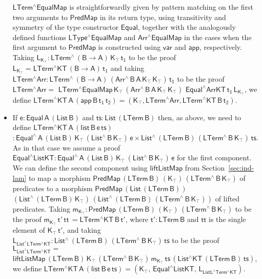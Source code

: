 \documentclass[9pt]{entcs}
\begin{document}
\begin{itemize}
  $\mathsf{LTerm^\wedge EqualMap}$ is straightforwardly given by
  pattern matching on the first two arguments to $\mathsf{PredMap}$ in
  its return type, using transitivity and symmetry of the type
  constructor $\mathsf{Equal}$, together with the analogously defined
  functions $\mathsf{LType^\wedge EqualMap}$ and $\mathsf{Arr^\wedge
    EqualMap}$ in the cases when the first argument to
  $\mathsf{PredMap}$ is constructed using $\mathsf{var}$ and
  $\mathsf{app}$, respectively. Taking $\mathsf{L_{K_\top} :
    LTerm^{\wedge}\, (B \to A) \, K_\top\, t_1}$ to be the proof
  $\mathsf{L_{K_\top} = LTerm^\wedge KT\, (B \to A)\, t_1}$ and taking
  $\mathsf{ LTerm^\wedge Arr : LTerm^{\wedge}\, (B \to A)\,
    (Arr^{\wedge} \, B\, A\, K_\top \, K_\top)\, t_1}$ to be the proof
  $\mathsf{LTerm^\wedge Arr =}$ $\mathsf{LTerm^\wedge
    EqualMap\,K_\top\,(Arr^{\wedge}\,B\,A\,K_\top\,K_\top)\,\,
    Equal^\wedge ArrKT\, t_1\, L_{K_\top}}$, we define
  $\mathsf{LTerm^\wedge KT\,A\, (app\, B\, t_1\, t_2) = (K_\top ,
    LTerm^\wedge Arr , LTerm^\wedge KT\,B\,t_2)}$.
\item If $\mathsf{e : Equal\,A\,(List\,B)}$ and $\mathsf{ts :
  List\,(LTerm\, B)}$ then, as above, we need to define
  $\mathsf{LTerm^\wedge KT\,A\, (list\, B \,e\, ts)}$ $\mathsf{:
  Equal^{\wedge} \, A\, (List\,B)\, K_\top\, (List^{\wedge} \, B\,
  K_\top) \, e \times List^{\wedge}\, (LTerm\,B) \, (LTerm^{\wedge} \,
  B\, K_\top) \, ts }$.  As in that case we assume a proof
  $\mathsf{Equal^\wedge ListKT : Equal^{\wedge} \, A\, (List\,B)\, K_\top\,
  (List^{\wedge} \, B\, K_\top) \, e}$ for the first component.  We
  can define the second component using $\mathsf{liftListMap}$ from
  Section~\ref{sec:ind-lam} to map a morphism $\mathsf{PredMap\,
    (LTerm\,B)\, (K_\top)\, (LTerm^{\wedge}\,B\,K_\top)}$ of
  predicates to a morphism $\mathsf{PredMap\,(List\,(LTerm\,B))}$
  $\mathsf{(List^{\wedge}\,(LTerm\,B)\,K_\top) \,
    (List^{\wedge}\,(LTerm\,B)\, (LTerm^{\wedge}\,B\,K_\top))}$ of
  lifted predicates.  Taking $\mathsf{m_{K_\top} : PredMap\,
    (LTerm\,B) \, (K_\top)\, (LTerm^{\wedge}\,B\,K_\top)}$ to be the
  proof $\mathsf{m_{K_\top} \, t'\, tt\, = LTerm^\wedge KT\, B\, t'}$,
  where $\mathsf{t' : LTerm\,B}$ and $\mathsf{tt}$ is the single
  element of $\mathsf{K_\top\, t'}$, and taking
  $\mathsf{L_{List^\wedge LTerm^\wedge KT} : List^{\wedge}\,
    (LTerm\,B) \, (LTerm^{\wedge} \, B\, K_\top) \, ts}$ to be the
  proof $\mathsf{ L_{List^\wedge LTerm^\wedge KT} =}$
  $\mathsf{liftListMap \, (LTerm\,B) \, K_\top \, (LTerm^{\wedge}\,
    B\, K_\top) \, m_{K_\top} \, ts \, (List^\wedge KT\, (LTerm\, B)\,
    ts) }$, we define $\mathsf{LTerm^\wedge KT\,A\, (list\, B\, e\,
    ts) = (K_\top , \, Equal^\wedge ListKT , \, L_{ListL^\wedge
      Term^\wedge KT} ) }$.
\end{itemize}
\end{document}
